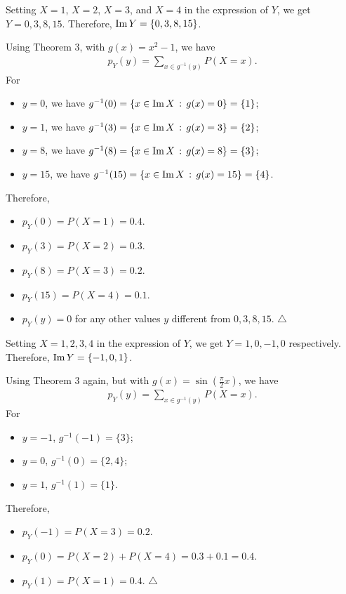     \begin{problem}
    Setting $X = 1$, $X = 2$, $X = 3$, and $X = 4$ in the expression of $Y$, we get $Y = 0, 3, 8, 15$. Therefore, $\operatorname{Im} Y = \{ 0, 3, 8, 15 \}$.

    Using Theorem 3, with $g(x) = x^2 - 1$, we have
        \begin{align*}
        p_Y (y) = \sum_{x \in g^{-1} (y)} P (X = x ) .
        \end{align*} 
    For 
        \begin{itemize}
            \item $y = 0$, we have $g^{-1} (0) = \{ x \in \operatorname{Im} X \, : \, g(x) = 0 \} = \{ 1 \}$;
            \item $y = 1$, we have $g^{-1} (3) = \{ x \in \operatorname{Im} X \, : \, g(x) = 3 \} = \{ 2 \}$;
            \item $y = 8$, we have $g^{-1} (8) = \{ x \in \operatorname{Im} X \, : \, g (x) = 8 \} = \{ 3 \}$;
            \item $y = 15$, we have $g^{-1} (15) = \{ x \in \operatorname{Im} X \, : \, g (x) = 15 \} = \{ 4 \}$. 
        \end{itemize}
    Therefore,
        \begin{itemize}
            \item $p_Y (0) = P (X = 1) = 0.4$.
            \item $p_Y (3) = P (X = 2) = 0.3$.
            \item $p_Y (8) = P (X = 3) = 0.2$.
            \item $p_Y (15) = P (X = 4) = 0.1$.
            \item $p_Y (y) = 0$ for any other values $y$ different from $0, 3, 8, 15$. \hfill $\triangle$
        \end{itemize}
    \end{problem}

    \begin{problem}
    Setting $X = 1, 2, 3, 4$ in the expression of $Y$, we get $Y = 1, 0, -1, 0$ respectively. Therefore, $\operatorname{Im} Y = \{ -1, 0, 1 \}$.

    Using Theorem 3 again, but with $g (x) = \sin (\frac{\pi}{2} x )$, we have
        \begin{align*}
        p_Y (y) = \sum_{x \in g^{-1} (y)} P (X = x ) .
        \end{align*} 
    For
        \begin{itemize}
            \item $y = -1$, $g^{-1}(-1) = \{ 3 \}$;
            \item $y = 0$, $g^{-1} (0) = \{ 2, 4 \}$;
            \item $y = 1$, $g^{-1} (1) = \{ 1 \}$.
        \end{itemize}
    Therefore,
        \begin{itemize}
            \item $p_Y (-1) = P (X = 3) = 0.2$.
            \item $p_Y (0) = P (X = 2) + P (X = 4) = 0.3 + 0.1 = 0.4$.
            \item $p_Y (1) = P (X = 1) = 0.4$. \hfill $\triangle$
        \end{itemize}
    \end{problem}

